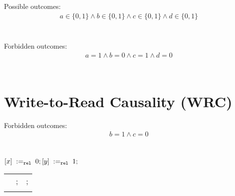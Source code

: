\begin{minipage}[t]{0.3\linewidth}
Possible outcomes:\\
\[\begin{array}{l}
a \in \{0, 1\} \land b \in \{0, 1\} \land c \in \{0, 1\} \land d \in \{0, 1\} \\
\end{array}\]\\
\end{minipage}
%
\iriwTemplate{\rel}{\rel}{\rel}{\rel}{\acq}{\acq}{\acq}{\acq}
\litmusTestEnd

\begin{minipage}[t]{0.3\linewidth}
Forbidden outcomes:\\
\[\begin{array}{l}
a = 1 \land b = 0 \land c = 1 \land d = 0 \\
\end{array}\]\\
\end{minipage}
%
\iriwTemplate{\sc}{\sc}{\sc}{\sc}{\sc}{\sc}{\sc}{\sc}
\litmusTestEnd

\section{Write-to-Read Causality (WRC)}
\label{app:wrc}

\begin{minipage}[t]{0.3\linewidth}
Forbidden outcomes:\\
\[\begin{array}{l}
b = 1 \land c = 0 \\
\end{array}\]\\
\end{minipage}
%
\codePrefix
  $[x] \;:=_{{\mathtt{rel}}}\;0; [y] \;:=_{{\mathtt{rel}}}\;1;$ \\
\begin{tabular}{L || L || L}
 &
; &
; \\

&
 &
 \\
\end{tabular}
\codePostfix
\litmusTestEnd

